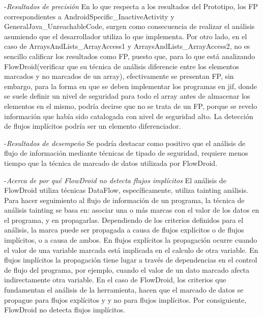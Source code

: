 -\textit{Resultados de precisión}\newline
En lo que respecta a los resultados del Prototipo, los FP correspondientes a
AndroidSpecific\_InactiveActivity y GeneralJava\_UnreachableCode, surgen como
consecuencia de realizar el análisis asumiendo que el desarrollador utiliza lo
que implementa.\newline 
Por otro lado, en el caso de ArraysAndLists\_ArrayAccess1 y
ArraysAndLists\_ArrayAccess2, no es sencillo calificar los resultados como FP,
puesto que, para lo que está analizando FlowDroid(verificar que su técnica de
análisis diferencie entre los elementos marcados y no marcados de un array),
efectivamente se presentan FP, sin embargo, para la forma en que se deben
implementar los programas en jif, donde se suele definir un nivel de seguridad
para todo el array antes de almacenar los elementos en el mismo, podría decirse
que no se trata de un FP, porque se revelo información que había sido
catalogada con nivel de seguridad alto.\newline 
La detección de flujos implícitos podría ser un elemento diferenciador.

-\textit{Resultados de desempeño}\newline
Se podría destacar como positivo que el análisis de flujo de información
mediante técnicas de tipado de seguridad, requiere menos tiempo que la técnica
de marcado de datos utilizada por FlowDroid.

-\textit{Acerca de por qué FlowDroid no detecta flujos implícitos}\newline
El análisis de FlowDroid utiliza técnicas DataFlow, específicamente, utiliza
tainting análisis. Para hacer seguimiento al flujo de información de un
programa, la técnica de análisis tainting se basa en: asociar una o más marcas
con el valor de los datos en el programa, y en propagarlas. Dependiendo de los
criterios definidos para el análisis, la marca puede ser propagada a causa de
flujos explícitos o de flujos implícitos, o a causa de ambos. En flujos
explícitos la propagación ocurre cuando el valor de una variable marcada está
implicada en el calculo de otra variable. En flujos implícitos la propagación
tiene lugar a través de dependencias en el control de flujo del programa, por
ejemplo, cuando el valor de un dato marcado afecta indirectamente otra variable.\newline 
En el caso de FlowDroid, los criterios que fundamentan el análisis de la
herramienta, hacen que el marcado de datos se propague para flujos explícitos y
y no para flujos implícitos. Por consiguiente, FlowDroid no detecta flujos
implícitos.

